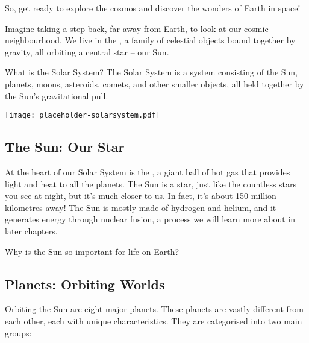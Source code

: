 So, get ready to explore the cosmos and discover the wonders of Earth in space!

\FloatBarrier
\1

Imagine taking a step back, far away from Earth, to look at our cosmic neighbourhood. We live in the , a family of celestial objects bound together by gravity, all orbiting a central star – our Sun.

\begin{keyconcept}{What is the Solar System?}
The Solar System is a system consisting of the Sun, planets, moons, asteroids, comets, and other smaller objects, all held together by the Sun’s gravitational pull.
\end{keyconcept}

\begin{marginfigure}
\texttt{[image: placeholder-solarsystem.pdf]}
\caption{\label{fig:solarsystem}A simplified model of our Solar System. \textit{Image to be added.}}
\end{marginfigure}

\subsection{The Sun: Our Star}

At the heart of our Solar System is the , a giant ball of hot gas that provides light and heat to all the planets.  The Sun is a star, just like the countless stars you see at night, but it's much closer to us. In fact, it’s about 150 million kilometres away!  The Sun is mostly made of hydrogen and helium, and it generates energy through nuclear fusion, a process we will learn more about in later chapters.

\begin{stopandthink}
Why is the Sun so important for life on Earth?
\end{stopandthink}

\subsection{Planets: Orbiting Worlds}

Orbiting the Sun are eight major planets.  These planets are vastly different from each other, each with unique characteristics.  They are categorised into two main groups:

